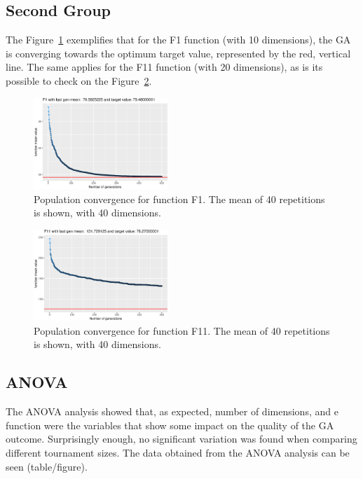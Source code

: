 \subsection{Second Group}
The Figure~\ref{convegenceF1} exemplifies that for the F1 function (with 10 dimensions), the GA is converging towards the optimum target value, represented by the red, vertical line. The same applies for the F11 function (with 20 dimensions), as is its possible to check on the Figure~\ref{convegenceF11}.

\begin{figure}[!ht]
	\includegraphics[width=0.45\textwidth]{img/unnamed-chunk-1-1}
	\caption{Population convergence for function F1. The mean of 40 repetitions is shown, with 40 dimensions.}
	\label{convegenceF1}
\end{figure}

\begin{figure}[!ht]
	\includegraphics[width=0.45\textwidth]{img/unnamed-chunk-1-11}
	\caption{Population convergence for function F11. The mean of 40 repetitions is shown, with 40 dimensions.}
	\label{convegenceF11}
\end{figure}

\subsection{ANOVA}
The ANOVA analysis showed that, as expected,  number of dimensions, and e function were the variables that show some impact on the quality of the GA outcome. Surprisingly enough,  no significant variation was found when comparing different tournament sizes. The data obtained from the ANOVA analysis can be seen (table/figure).